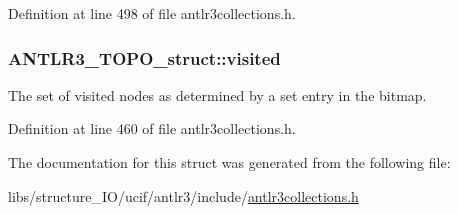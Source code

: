 Definition at line 498 of file antlr3collections.\-h.

\hypertarget{struct_a_n_t_l_r3___t_o_p_o__struct_a067c02a397704d719faaa2611f7fdf8e}{
\subsubsection[{visited}]{ A\-N\-T\-L\-R3\-\_\-\-T\-O\-P\-O\-\_\-struct\-::visited}}\label{struct_a_n_t_l_r3___t_o_p_o__struct_a067c02a397704d719faaa2611f7fdf8e}
The set of visited nodes as determined by a set entry in the bitmap. 

Definition at line 460 of file antlr3collections.\-h.



The documentation for this struct was generated from the following file\-:\begin{DoxyCompactItemize}
\item 
libs/structure\-\_\-\-I\-O/ucif/antlr3/include/\hyperlink{antlr3collections_8h}{antlr3collections.\-h}\end{DoxyCompactItemize}
